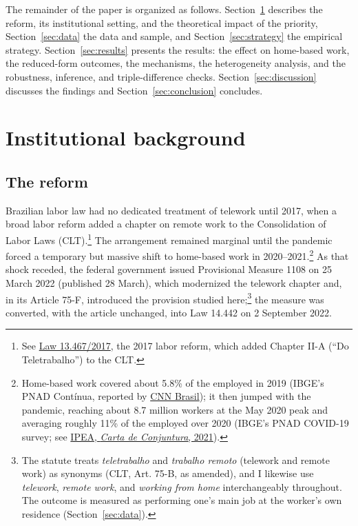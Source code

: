 \documentclass[12pt]{article}
\begin{document}
The remainder of the paper is organized as follows. Section~\ref{sec:background} describes the reform, its institutional setting, and the theoretical impact of the priority, Section~\ref{sec:data} the data and sample, and Section~\ref{sec:strategy} the empirical strategy. Section~\ref{sec:results} presents the results: the effect on home-based work, the reduced-form outcomes, the mechanisms, the heterogeneity analysis, and the robustness, inference, and triple-difference checks. Section~\ref{sec:discussion} discusses the findings and Section~\ref{sec:conclusion} concludes.

\section{Institutional background}\label{sec:background}

\subsection{The reform}

Brazilian labor law had no dedicated treatment of telework until 2017, when a broad labor reform added a chapter on remote work to the Consolidation of Labor Laws (CLT).\footnote{See \href{https://www.planalto.gov.br/ccivil_03/_ato2015-2018/2017/lei/l13467.htm}{Law 13.467/2017}, the 2017 labor reform, which added Chapter II-A (``Do Teletrabalho'') to the CLT.} The arrangement remained marginal until the pandemic forced a temporary but massive shift to home-based work in 2020--2021.\footnote{Home-based work covered about 5.8\% of the employed in 2019 (IBGE's PNAD Cont\'inua, reported by \href{https://www.cnnbrasil.com.br/economia/macroeconomia/trabalho-remoto-mais-que-dobrou-em-10-anos-mas-caiu-apos-pandemia-mostra-ibge/}{CNN Brasil}); it then jumped with the pandemic, reaching about 8.7 million workers at the May 2020 peak and averaging roughly 11\% of the employed over 2020 (IBGE's PNAD COVID-19 survey; see \href{https://www.ipea.gov.br/cartadeconjuntura/index.php/2021/02/o-trabalho-remoto-e-a-pandemia-o-que-a-pnad-covid-19-nos-mostrou/}{IPEA, \emph{Carta de Conjuntura}, 2021}).} As that shock receded, the federal government issued Provisional Measure 1108 on 25 March 2022 (published 28 March), which modernized the telework chapter and, in its Article 75-F, introduced the provision studied here;\footnote{The statute treats \emph{teletrabalho} and \emph{trabalho remoto} (telework and remote work) as synonyms (CLT, Art. 75-B, as amended), and I likewise use \emph{telework}, \emph{remote work}, and \emph{working from home} interchangeably throughout. The outcome is measured as performing one's main job at the worker's own residence (Section~\ref{sec:data}).} the measure was converted, with the article unchanged, into Law 14.442 on 2 September 2022.
\end{document}
